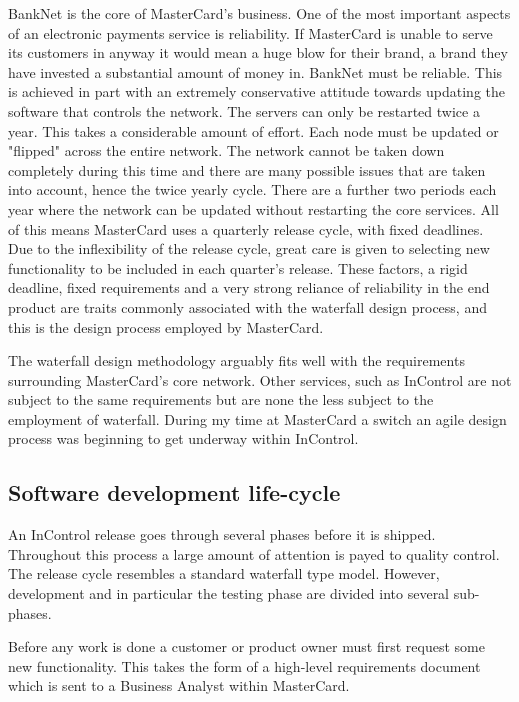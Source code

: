 \documentclass[a4paper, 11pt, titlepage]{article}
\begin{document}
BankNet is the core of MasterCard’s business. One of the most important aspects of an electronic payments service is reliability. If MasterCard is unable to serve its customers in anyway it would mean a huge blow for their brand, a brand they have invested a substantial amount of money in. BankNet must be reliable. This is achieved in part with an extremely conservative attitude towards updating the software that controls the network. The servers can only be restarted twice a year. This takes a considerable amount of effort. Each node must be updated or "flipped" across the entire network. The network cannot be taken down completely during this time and there are many possible issues that are taken into account, hence the twice yearly cycle. There are a further two periods each year where the network can be updated without restarting the core services. All of this means MasterCard uses a quarterly release cycle, with fixed deadlines. Due to the inflexibility of the release cycle, great care is given to selecting new functionality to be included in each quarter’s release. These factors, a rigid deadline, fixed requirements and a very strong reliance of reliability in the end product are traits commonly associated with the waterfall design process, and this is the design process employed by MasterCard. 
 
The waterfall design methodology arguably fits well with the requirements surrounding MasterCard’s core network. Other services, such as InControl are not subject to the same requirements but are none the less subject to the employment of waterfall. During my time at MasterCard a switch an agile design process was beginning to get underway within InControl. 
 
\subsection{Software development life-cycle}

An InControl release goes through several phases before it is shipped. Throughout this process a large amount of attention is payed to quality control. The release cycle resembles a standard waterfall type model. However, development and in particular the testing phase are divided into several sub-phases.

Before any work is done a customer or product owner must first request some new functionality. This takes the form of a high-level requirements document which is sent to a Business Analyst within MasterCard.
\end{document}
